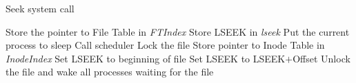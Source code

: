 \documentclass[10pt]{article}
\begin{document}
\begin{algorithm}
\caption{Seek system call}
\begin{algorithmic}
\ENDIF
{}
\ELSE 
    \STATE Store the pointer to File Table in \textit{FTIndex}
    \STATE Store LSEEK in \textit{lseek}
\ENDIF
{}
            \STATE Put the current process to sleep 
            \STATE Call scheduler
        \ENDWHILE
    \ENDIF
\ENDIF
\STATE Lock the file
\STATE Store pointer to Inode Table in \textit{InodeIndex}
\ENDIF
{}
    \STATE Set LSEEK to beginning of file
\ELSE
    \STATE Set LSEEK to LSEEK$+$Offset
\ENDIF
\STATE Unlock the file and wake all processes waiting for the file
\end{algorithmic}
\end{algorithm}
\vspace{15mm}
\end{document}
